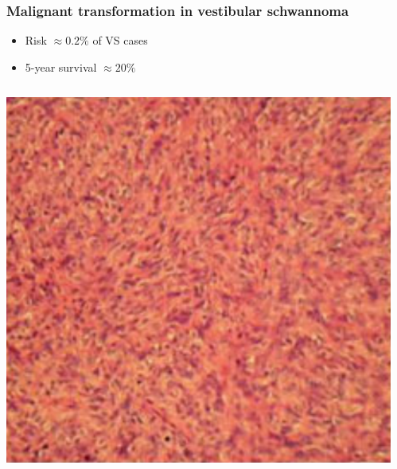\documentclass{beamer}
\begin{document}
\begin{frame}
    \frametitle{Malignant transformation in vestibular schwannoma}
    \begin{itemize}
        \item Risk $\approx 0.2\%$ of VS cases
        \item 5-year survival $\approx 20\%$\footnotemark[2]
    \end{itemize}

    \begin{columns}
        \begin{column}{0.5\textwidth}
        \includegraphics[width=\textwidth]{figures/AKDemetriades_Fig5C.png}
        \end{column}
        \begin{column}{0.5\textwidth}

\end{column}
\end{columns}
\end{frame}
\end{document}
